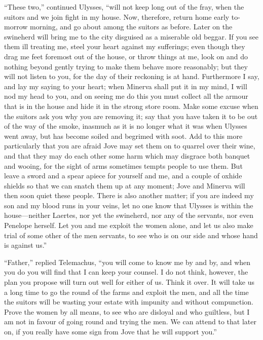 “These two,” continued Ulysses, “will not keep long out of the fray, when the
suitors and we join fight in my house. Now, therefore, return home early
to-morrow morning, and go about among the suitors as before. Later on the
swineherd will bring me to the city disguised as a miserable old beggar. If you
see them ill treating me, steel your heart against my sufferings; even though
they drag me feet foremost out of the house, or throw things at me, look on and
do nothing beyond gently trying to make them behave more reasonably; but they
will not listen to you, for the day of their reckoning is at hand. Furthermore
I say, and lay my saying to your heart; when Minerva shall put it in my mind, I
will nod my head to you, and on seeing me do this you must collect all the
armour that is in the house and hide it in the strong store room. Make some
excuse when the suitors ask you why you are removing it; say that you have
taken it to be out of the way of the smoke, inasmuch as it is no longer what it
was when Ulysses went away, but has become soiled and begrimed with soot. Add
to this more particularly that you are afraid Jove may set them on to quarrel
over their wine, and that they may do each other some harm which may disgrace
both banquet and wooing, for the sight of arms sometimes tempts people to use
them. But leave a sword and a spear apiece for yourself and me, and a couple of
oxhide shields so that we can snatch them up at any moment; Jove and Minerva
will then soon quiet these people. There is also another matter; if you are
indeed my son and my blood runs in your veins, let no one know that Ulysses is
within the house—neither Laertes, nor yet the swineherd, nor any of the
servants, nor even Penelope herself. Let you and me exploit the women alone,
and let us also make trial of some other of the men servants, to see who is on
our side and whose hand is against us.”

“Father,” replied Telemachus, “you will come to know me by and by, and when you
do you will find that I can keep your counsel. I do not think, however, the
plan you propose will turn out well for either of us. Think it over. It will
take us a long time to go the round of the farms and exploit the men, and all
the time the suitors will be wasting your estate with impunity and without
compunction. Prove the women by all means, to see who are disloyal and who
guiltless, but I am not in favour of going round and trying the men. We can
attend to that later on, if you really have some sign from Jove that he will
support you.”


